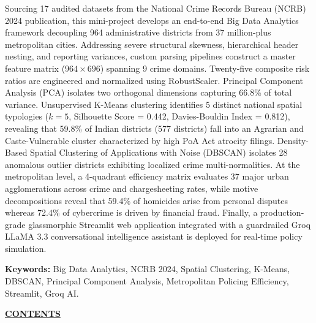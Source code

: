 \documentclass[12pt,a4paper]{report}
\begin{document}
\noindent Sourcing 17 audited datasets from the National Crime Records Bureau (NCRB) 2024 publication, this mini-project develops an end-to-end Big Data Analytics framework decoupling 964 administrative districts from 37 million-plus metropolitan cities. Addressing severe structural skewness, hierarchical header nesting, and reporting variances, custom parsing pipelines construct a master feature matrix ($964 \times 696$) spanning 9 crime domains. Twenty-five composite risk ratios are engineered and normalized using RobustScaler. Principal Component Analysis (PCA) isolates two orthogonal dimensions capturing 66.8\% of total variance. Unsupervised K-Means clustering identifies 5 distinct national spatial typologies ($k=5$, Silhouette Score = 0.442, Davies-Bouldin Index = 0.812), revealing that 59.8\% of Indian districts (577 districts) fall into an Agrarian and Caste-Vulnerable cluster characterized by high PoA Act atrocity filings. Density-Based Spatial Clustering of Applications with Noise (DBSCAN) isolates 28 anomalous outlier districts exhibiting localized crime multi-normalities. At the metropolitan level, a 4-quadrant efficiency matrix evaluates 37 major urban agglomerations across crime and chargesheeting rates, while motive decompositions reveal that 59.4\% of homicides arise from personal disputes whereas 72.4\% of cybercrime is driven by financial fraud. Finally, a production-grade glassmorphic Streamlit web application integrated with a guardrailed Groq LLaMA 3.3 conversational intelligence assistant is deployed for real-time policy simulation.

\vspace{0.8cm}
\noindent \textbf{Keywords:} Big Data Analytics, NCRB 2024, Spatial Clustering, K-Means, DBSCAN, Principal Component Analysis, Metropolitan Policing Efficiency, Streamlit, Groq AI.
\newpage

\thispagestyle{frontmatterstyle}
\begin{center}
    {\fontsize{16}{20}\selectfont\bfseries\underline{CONTENTS}\par}
\end{center}
\vspace{0.5cm}
\tableofcontents
\newpage
\end{document}
